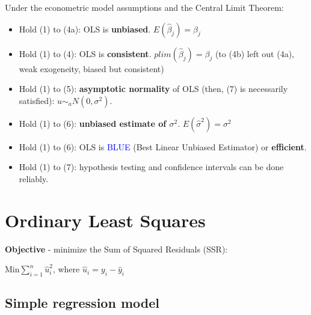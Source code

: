 \documentclass[10pt, a4paper, landscape]{extarticle}
\begin{document}
\begin{multicols}{3}
Under the econometric model assumptions and the Central Limit Theorem:
\begin{itemize}[leftmargin=*]
\item Hold (1) to (4a): OLS is \textbf{unbiased}. $E(\hat{\beta}_j) = \beta_j$
\item Hold (1) to (4): OLS is \textbf{consistent}. $plim(\hat{\beta}_j) = \beta_j$ (to (4b) left out (4a), weak exogeneity, biased but consistent)
\item Hold (1) to (5): \textbf{asymptotic normality} of OLS (then, (7) is necessarily satisfied): $u \sim_a N(0,\sigma^2)$.
\item Hold (1) to (6): \textbf{unbiased estimate of $\sigma^2$}. $E(\hat{\sigma}^2) = \sigma^2$
\item Hold (1) to (6): OLS is \textcolor{blue}{BLUE} (Best Linear Unbiased Estimator) or \textbf{efficient}. 
\item Hold (1) to (7): hypothesis testing and confidence intervals can be done reliably.
\end{itemize}

\section*{Ordinary Least Squares}

\textbf{Objective} - minimize the Sum of Squared Residuals (SSR):

\begin{center}
$\text{Min} \sum_{i=1}^n \hat{u}_i^2$, where $\hat{u}_i = y_i - \hat{y}_i$
\end{center}

\subsection*{Simple regression model}

\setlength{\multicolsep}{0pt} %
\setlength{\columnsep}{-40pt} %
\begin{multicols}{2} %



\end{multicols}
\end{multicols}
\end{document}
